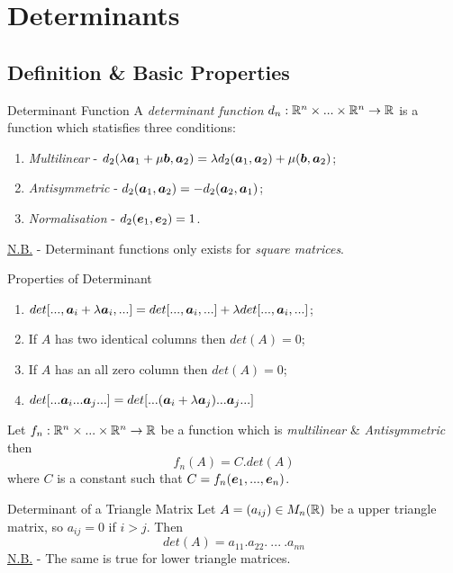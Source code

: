 \documentclass[11pt,a4paper]{article}
\begin{document}
\section{Determinants}
%
\subsection{Definition \& Basic Properties}

\subtitle{Definition 6.01 - }{Determinant Function}
A \textit{determinant function} $d_n : \mathbb{R}^n \times ... \times \mathbb{R}^n \to \mathbb{R}$ is a function which statisfies three conditions:
\begin{enumerate}[label=\roman*)]
  \item \textit{Multilinear} - $d_2(\lambda\boldsymbol{a}_1 + \mu\boldsymbol{b}, \boldsymbol{a}_2) = \lambda d_2(\boldsymbol{a}_1, \boldsymbol{a}_2) + \mu(\boldsymbol{b}, \boldsymbol{a}_2)$;
  \item \textit{Antisymmetric} - $d_2(\boldsymbol{a}_1, \boldsymbol{a}_2) = -d_2(\boldsymbol{a}_2, \boldsymbol{a}_1)$;
  \item \textit{Normalisation} - $d_2(\boldsymbol{e}_1, \boldsymbol{e}_2) = 1$.
\end{enumerate}
\underline{N.B.} - Determinant functions only exists for \textit{square matrices}. \\

\subtitle{Theorem 6.02 - }{Properties of Determinant}
\begin{enumerate}[label=\roman*)]
  \item $det[ ... , \boldsymbol{a}_i + \lambda\boldsymbol{a}_i , ...] = det[ ... , \boldsymbol{a}_i , ...] + \lambda det[ ... , \boldsymbol{a}_i , ...]$;
  \item If $A$ has two identical columns then $det(A) = 0$;
  \item If $A$ has an all zero column then $det(A) = 0$;
  \item $det[... \boldsymbol{a}_i ... \boldsymbol{a}_j ...] = det[... (\boldsymbol{a}_i + \lambda\boldsymbol{a}_j) ... \boldsymbol{a}_j ...]$
\end{enumerate}

\subtitle{Theorem 6.03}{}
Let $f_n : \mathbb{R}^n \times ... \times \mathbb{R}^n \to \mathbb{R}$ be a function which is \textit{multilinear} \& \textit{Antisymmetric} then $$f_n(A) = C.det(A)$$
where $C$ is a constant such that $C = f_n(\boldsymbol{e}_1, ... , \boldsymbol{e}_n)$. \\

\subtitle{Theorem 6.04 - }{Determinant of a Triangle Matrix}
Let $A = (a_{ij}) \in M_{n}(\mathbb{R})$ be a upper triangle matrix, so $a_{ij} = 0$ if $i > j$. Then $$det(A) = a_{11}.a_{22}.\ ...\ .a_{nn}$$
\underline{N.B.} - The same is true for lower triangle matrices. \\
\end{document}
